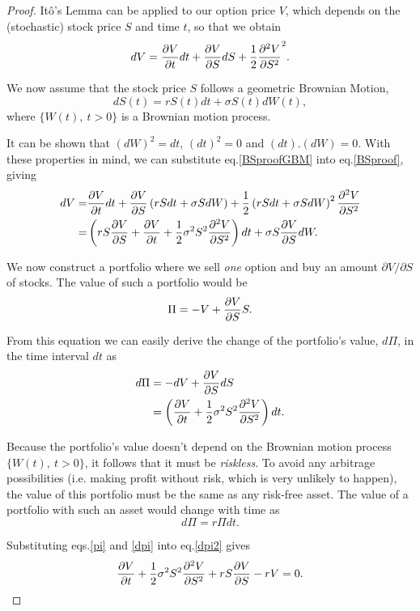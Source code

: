 \begin{proof}
Itô's Lemma can be applied to our option price $V$, which depends on the (stochastic) stock price $S$ and time $t$, so that we obtain
\begin{equation}\label{BSproof}
dV=\pdv{V}{t}dt+\pdv{V}{S}dS+\frac{1}{2}\pdv{^2V}{S^2} (dS)^2.
\end{equation}

We now assume that the stock price $S$ follows a geometric Brownian Motion,
\begin{equation}\label{BSproofGBM}
dS(t)=rS(t)dt+\sigma S(t)dW(t),
\end{equation}
\noindent where $\{W(t),\ t>0\}$ is a Brownian motion process.

It can be shown that $(dW)^2=dt$, $(dt)^2=0$ and $(dt).(dW)=0$. With these properties in mind, we can substitute eq.\eqref{BSproofGBM} into eq.\eqref{BSproof}, giving
\begin{equation}
\begin{split}
dV=&\pdv{V}{t}dt+\pdv{V}{S}\left(rSdt+\sigma SdW\right)+\frac{1}{2}\left(rSdt+\sigma SdW\right)^2\pdv{^2V}{S^2}\\
=&\left(rS\pdv{V}{S}+\pdv{V}{t}+\frac{1}{2}\sigma^2S^2\pdv{^2V}{S^2}\right)dt+\sigma S\pdv{V}{S}dW.
\end{split}
\end{equation}


We now construct a portfolio where we sell \emph{one} option and buy an amount $\partial V/\partial S$ of stocks. The value of such a portfolio would be
\begin{equation}\label{pi}
\Pi=-V+\pdv{V}{S}S.
\end{equation}

From this equation we can easily derive the change of the portfolio's value, $d\Pi$, in the time interval $dt$ as
\begin{equation}\label{dpi}
\begin{split}
d\Pi&=-dV+\pdv{V}{S}dS\\
&=\left(\pdv{V}{t}+\frac{1}{2}\sigma^2S^2\pdv{^2V}{S^2}\right)dt.
\end{split}
\end{equation}

Because the portfolio's value doesn't depend on the Brownian motion process $\{W(t),\ t>0\}$, it follows that it must be \emph{riskless}.
To avoid any arbitrage possibilities (i.e. making profit without risk, which is very unlikely to happen), the value of this portfolio must be the same as any risk-free asset. The value of a portfolio with such an asset would change with time as
\begin{equation}\label{dpi2}
d\Pi=r\Pi dt.
\end{equation}

Substituting eqs.\eqref{pi} and \eqref{dpi} into eq.\eqref{dpi2} gives
\begin{equation}
\pdv{V}{t}+\frac{1}{2}\sigma^2S^2\pdv{^2V}{S^2}+rS\pdv{V}{S}-rV=0.
\end{equation}

\end{proof}


